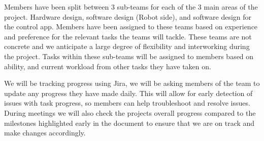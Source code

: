 \documentclass{article}
\begin{document}
Members have been split between 3 sub-teams for each of the 3 main areas of the project. Hardware design, software design (Robot side), and software design for the control app. Members have been assigned to these teams based on experience and preference for the relevant tasks the teams will tackle. These teams are not concrete and we anticipate a large degree of flexibility and interworking during the project. Tasks within these sub-teams will be assigned to members based on ability, and current workload from other tasks they have taken on. 

We will be tracking progress using Jira, we will be asking members of the team to update any progress they have made daily. This will allow for early detection of issues with task progress, so members can help troubleshoot and resolve issues. During meetings we will also check the projects overall progress compared to the milestones highlighted early in the document to ensure that we are on track and make changes accordingly.




\end{document}
